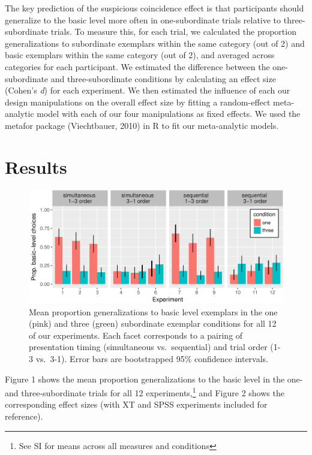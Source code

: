 \documentclass[english,floatsintext,man]{apa6}
\theoremstyle{definition}
\theoremstyle{definition}
\theoremstyle{remark}
\begin{document}
The key prediction of the suspicious coincidence effect is that
participants should generalize to the basic level more often in
one-subordinate trials relative to three-subordinate trials. To measure
this, for each trial, we calculated the proportion generalizations to
subordinate exemplars within the same category (out of 2) and basic
exemplars within the same category (out of 2), and averaged across
categories for each participant. We estimated the difference between the
one-subordinate and three-subordinate conditions by calculating an
effect size (Cohen's \emph{d}) for each experiment. We then estimated
the influence of each our design manipulations on the overall effect
size by fitting a random-effect meta-analytic model with each of our
four manipulations as fixed effects. We used the metafor package
(Viechtbauer, 2010) in R to fit our meta-analytic models.

\section{Results}\label{results}

\begin{figure}
\centering
\includegraphics{xtmem_files/figure-latex/unnamed-chunk-3-1.pdf}
\caption{\label{fig:unnamed-chunk-3}Mean proportion generalizations to basic
level exemplars in the one (pink) and three (green) subordinate exemplar
conditions for all 12 of our experiments. Each facet corresponds to a
pairing of presentation timing (simultaneous vs.~sequential) and trial
order (1-3 vs.~3-1). Error bars are bootstrapped 95\% confidence
intervals.}
\end{figure}

Figure 1 shows the mean proportion generalizations to the basic level in
the one- and three-subordinate trials for all 12
experiments,\footnote{See SI for means across all measures and conditions}
and Figure 2 shows the corresponding effect sizes (with XT and SPSS
experiments included for reference).
\end{document}
